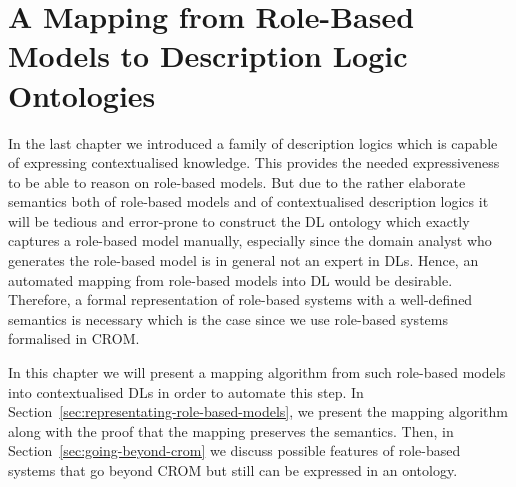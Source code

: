 
\chapter{A Mapping from Role-Based Models to Description Logic Ontologies}
\label{cha:mapping}

In the last chapter we introduced a family of description logics which is capable of expressing
contextualised knowledge. This provides the needed expressiveness to be able to reason on role-based
models. But due to the rather elaborate semantics both of role-based models and of contextualised
description logics it will be tedious and error-prone to construct the DL ontology which exactly
captures a role-based model manually, especially since the domain analyst who generates the
role-based model is in general not an expert in DLs. Hence, an automated mapping from role-based
models into DL would be desirable. Therefore, a formal representation of role-based systems with a
well-defined semantics is necessary which is the case since we use role-based systems formalised in
CROM.

In this chapter we will present a mapping algorithm from such role-based models into contextualised
DLs in order to automate this step.
%
%
In Section~\ref{sec:representating-role-based-models}, we present the mapping algorithm along with
the proof that the mapping preserves the semantics. Then, in Section~\ref{sec:going-beyond-crom} we
discuss possible features of role-based systems that go beyond CROM but still can be expressed in an
ontology.





